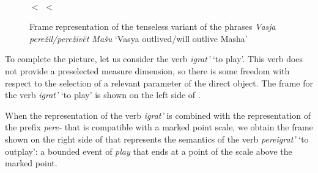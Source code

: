 \begin{figure}
\begin{minipage}{0.6\textwidth}
\end{minipage}\hfill%
\begin{minipage}{0.35\textwidth}\centering
{}\\
 $<$  $<$ 
\end{minipage}
\caption{Frame representation of the tenseless variant of the phrases \textit{Vasja pere\v{z}il/pere\v{z}iv\"{e}t Ma\v{s}u} `Vasya outlived/will outlive Masha'  \label{frame:Vasja:outlive:Masha}}
\end{figure}

To complete the picture, let us consider the verb \textit{igrat'} `to play'. This verb does not provide a preselected measure dimension, so there is some freedom with respect to the selection of a relevant parameter of the direct object. The frame for the verb \textit{igrat'} `to play' is shown on the left side of . 

When the representation of the verb \textit{igrat'} is combined with the representation of the prefix \textit{pere-} that is compatible with a marked point  scale, we obtain the frame shown on the right side of  that represents the semantics of the verb \textit{pereigrat'} `to outplay': a bounded event of \MANN \textit{play} that ends at a point of the scale above the marked point. 

